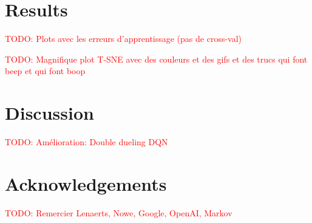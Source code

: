 \documentclass[letterpaper]{article}
\newcommand\todo[1]{\textcolor{red}{TODO: #1}}
\begin{document}
\section{Results}

  \todo{Plots avec les erreurs d'apprentissage (pas de cross-val)}

  \todo{Magnifique plot T-SNE avec des couleurs et des gifs et des trucs qui font beep et qui font boop} \citep{wattenberg2016how}

\section{Discussion}

  \todo{Amélioration: Double dueling DQN} \citep{DBLP:journals/corr/WangFL15}

\section{Acknowledgements}

  \todo{Remercier Lenaerts, Nowe, Google, OpenAI, Markov}

\footnotesize


\end{document}
